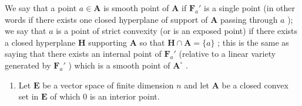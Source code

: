 We say that a point \(a \in \mathbf{A}\) is smooth point of \(\mathbf{A}\) if \(\mathbf{F}_a'\) is a single point (in other words if there exists one closed hyperplane of support of \(\mathbf{A}\) passing through \(a\) ); we say that \(a\) is a point of strict convexity (or is an exposed point) if there exists a closed hyperplane \(\mathbf{H}\) supporting \(\mathbf{A}\) so that \(\mathbf{H} \cap \mathbf{A} = \{a\}\) ; this is the same as saying that there exists an internal point of \(\mathbf{F}_a'\) (relative to a linear variety generated by \(\mathbf{F}_a'\) ) which is a smooth point of \(\mathbf{A}^\circ\) .

\begin{enumerate}
\def\labelenumi{\arabic{enumi})}
\setcounter{enumi}{6}
\tightlist
\item
  Let \(\mathbf{E}\) be a vector space of finite dimension \(n\) and let \(\mathbf{A}\) be a closed convex set in \(\mathbf{E}\) of which 0 is an interior point.
\end{enumerate}

